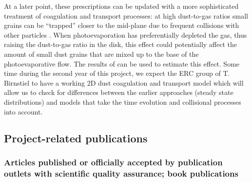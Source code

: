 \documentclass[10pt,fleqn,twoside]{article}
\newcommand{\Tcol}{\color{blue}}
\begin{document}
At a later point, these prescriptions can be updated with a more
sophisticated treatment of coagulation and transport processes: at
high dust-to-gas ratios small grains can be ``trapped'' closer to the
mid-plane due to frequent collisions with other particles
\citep{2016ApJ...822..111K}. When photoevaporation has preferentially
depleted the gas, thus raising the dust-to-gas ratio in the disk, this
effect could potentially affect the amount of small dust grains that
are mixed up to the base of the photoevaporative flow. The results of
\citet{2016ApJ...822..111K} can be used to estimate this effect.
Some time during the second  year of this project, we expect the ERC
group of T. Birnstiel to have a working 2D dust coagulation and
transport model which will allow us to check for differences between
the earlier approaches (steady state distributions) and models that
take the time evolution and collisional processes into account.

\subsection{\Tcol Project-related publications}


\subsubsection{\Tcol 
Articles published or officially accepted by publication outlets with scientific quality assurance;
book publications}
\end{document}
